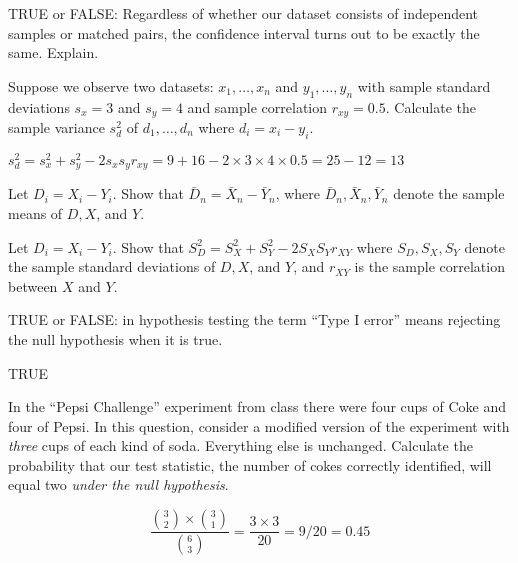 \documentclass[addpoints,12pt]{exam}
\begin{document}
\begin{questions}
  \question TRUE or FALSE: Regardless of whether our dataset consists of independent samples or matched pairs, the confidence interval turns out to be exactly the same. Explain.


  \question Suppose we observe two datasets: $x_1, \dots, x_n$ and $y_1, \dots, y_n$ with sample standard deviations $s_x = 3$ and $s_y = 4$ and sample correlation $r_{xy} = 0.5$.
  Calculate the sample variance $s_d^2$ of $d_1, \dots, d_n$ where $d_i = x_i - y_i$.
  \begin{solution}
    $s_d^2 = s_x^2 + s_y^2 - 2 s_x s_y r_{xy} = 9 + 16 - 2 \times 3 \times 4 \times 0.5 = 25 - 12 = 13$
  \end{solution}

\question Let $D_i = X_i - Y_i$. Show that $\bar{D}_n = \bar{X}_n - \bar{Y}_n$, where $\bar{D}_n, \bar{X}_n, \bar{Y}_n$ denote the sample means of $D, X$, and  $Y$.

\question Let $D_i = X_i - Y_i$. Show that $S_D^2 = S_X^2 + S_Y^2 - 2 S_X S_Y r_{XY}$ where $S_D, S_X, S_Y$ denote the sample standard deviations of $D, X$, and $Y$, and $r_{XY}$ is the sample correlation between $X$ and $Y$.




  \question TRUE or FALSE: in hypothesis testing the term ``Type I error'' means rejecting the null hypothesis when it is true.
  \begin{solution}
    TRUE
  \end{solution}

  \question In the ``Pepsi Challenge'' experiment from class there were four cups of Coke and four of Pepsi.
In this question, consider a modified version of the experiment with \emph{three} cups of each kind of soda.
Everything else is unchanged.
Calculate the probability that our test statistic, the number of cokes correctly identified, will equal two \emph{under the null hypothesis}.
\begin{solution}
  \[
    \frac{ \displaystyle {3 \choose 2} \times {3 \choose 1} }{\displaystyle{6 \choose 3}} = \frac{3 \times 3}{20} = 9/20 = 0.45
  \]
\end{solution}


\end{questions}
\end{document}
